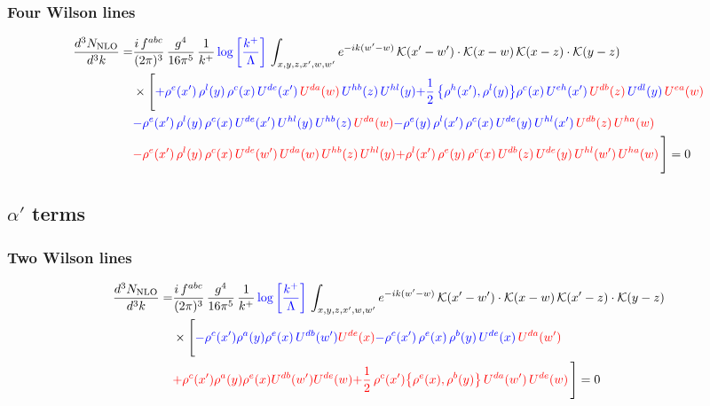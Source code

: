 \documentclass[9pt]{article}
\numberwithin{equation}{section}
\begin{document}
\subsubsection{Four Wilson lines}
\begin{align}
\frac{d^{3}N_{\rm NLO}}{d^{3}k} = &\frac{i\,f^{abc}}{(2\pi)^{3}}\,\frac{g^{4}}{16\pi^{5}}\,\frac{1}{k^{+}}\,{\color{blue}\log{\left[\frac{k^{+}}{\Lambda}\right]}}\,\int_{x,y,z,x',w,w'}e^{-ik(w'-w)}\,\mathcal{K}(x'-w')\cdot\mathcal{K}(x-w)\,\mathcal{K}(x-z)\cdot\mathcal{K}(y-z)\notag\\
&\times\Bigg[{\color{blue}+\rho^{e}(x')\, \rho^{l}(y)\,\rho^{c}(x)\, U^{de}(x')\,{\color{red}U^{da}(w)}\,U^{hb}(z)\,U^{hl}(y)}{\color{blue}+\frac{1}{2}\,\big\{\rho^{h}(x'),\rho^{l}(y)\big\}\rho^{c}(x)\,U^{eh}(x')\,{\color{red}U^{db}(z)}\,U^{dl}(y)\,{\color{red}U^{ea}(w)}}\notag \\
&{\color{blue}-\rho^{e}(x')\,\rho^{l}(y)\,\rho^{c}(x)\,U^{de}(x')\,U^{hl}(y)\,U^{hb}(z)\,{\color{red}U^{da}(w)}}{\color{blue}-\rho^{e}(y)\,\rho^{l}(x')\,\rho^{c}(x)\,U^{de}(y)\,U^{hl}(x')\,{\color{red}U^{db}(z)}\,{\color{red}U^{ha}(w)}} \notag \\ &{\color{red}-\rho^{e}(x')\, \rho^{l}(y)\,\rho^{c}(x)\, U^{de}(w')\,{\color{red}U^{da}(w)}\,U^{hb}(z)\,U^{hl}(y)}{\color{red}+\rho^{l}(x')\,\rho^{e}(y)\,\rho^{c}(x)\,{\color{red}U^{db}(z)}\,U^{de}(y)\,U^{hl}(w')\,{\color{red}U^{ha}(w)}}\,\Bigg] = 0
\end{align}
\subsection{$\alpha'$ terms}
\subsubsection{Two Wilson lines}
\begin{align}
\frac{d^{3}N_{\rm NLO}}{d^{3}k}= & \frac{i\,f^{abc}}{(2\pi)^{3}}\,\frac{g^{4}}{16\pi^{5}}\,\frac{1}{k^{+}}\,{\color{blue}\log{\left[\frac{k^{+}}{\Lambda}\right]}}\,\int_{x,y,z,x',w,w'}e^{-ik(w'-w)}\,\mathcal{K}(x'-w')\cdot\mathcal{K}(x-w)\,\mathcal{K}(x'-z)\cdot\mathcal{K}(y-z)\notag \\ & \times\Bigg[ {\color{blue}-\rho^{c}(x') \rho^{a}(y) \rho^{e}(x)\,U^{d b}(w') {\color{red}U^{de}(x)}}{\color{blue}-\rho^{c}(x')\,\rho^{e}(x)\,\rho^{b}(y)\,U^{de}(x)\,{\color{red}U^{da}(w')}}\notag \\
&{\color{red}+\rho^{c}(x') \rho^{a}(y) \rho^{e}(x) {\color{red}U^{db}(w')} {\color{red}U^{de}(w)}}{\color{red}+\frac{1}{2}\,\rho^{c}(x')\big\{\rho^{e}(x),\rho^{b}(y)\big\}\,{\color{red}U^{da}(w')}\,U^{de}(w)}\,\Bigg] = 0
\end{align}
\end{document}
